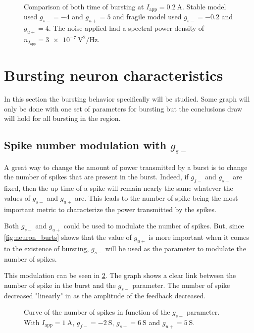 \begin{figure}[!htb]
    \centering
    \caption{Comparison of both time of bursting at $I_\text{app}=\qty{0.2}{\ampere}$. Stable model used $g_{s-}=-4$ and $g_{u+}=5$ and fragile model used $g_{s-}=-0.2$ and $g_{u+}=4$. The noise applied had a spectral power density of  $n_{I_\text{app}} = \qty{3e-7}{\volt\squared\per\hertz}$.}
    \label{fig:neuron_burts_comp}
\end{figure}

\section{Bursting neuron characteristics}

In this section the bursting behavior specifically will be studied. Some graph will only be done with one set of parameters for bursting but the conclusions draw will hold for all bursting in the region. 

\subsection{Spike number modulation with $g_{s-}$}\label{sec:spike_mod}

A great way to change the amount of power transmitted by a burst is to change the number of spikes that are present in the burst. Indeed, if $g_{f-}$ and $g_{s+}$ are fixed, then the up time of a spike will remain nearly the same whatever the values of $g_{s-}$ and $g_{u+}$ are. This leads to the number of spike being the most important metric to characterize the power transmitted by the spikes. 

Both $g_{s-}$ and $g_{u+}$ could be used to modulate the number of spikes. But, since \cref{fig:neuron_burts} shows that the value of $g_{u+}$ is more important when it comes to the existence of bursting, $g_{s-}$ will be used as the parameter to modulate the number of spikes.

This modulation can be seen in \cref{fig:neuron_burst_spikes}. The graph shows a clear link between the number of spike in the burst and the $g_{s-}$ parameter. The number of spike decreased "linearly" in as the amplitude of the feedback decreased.


\begin{figure}[!htb]
    \centering
    \caption{Curve of the number of spikes in function of the $g_{s-}$ parameter. With $I_\text{app} = \qty{1}{\ampere}$, $g_{f-} = \qty{-2}{\siemens}$, $g_{s+} = \qty{6}{\siemens}$ and $g_{u+} = \qty{5}{\siemens}$.}
    \label{fig:neuron_burst_spikes}
\end{figure}

